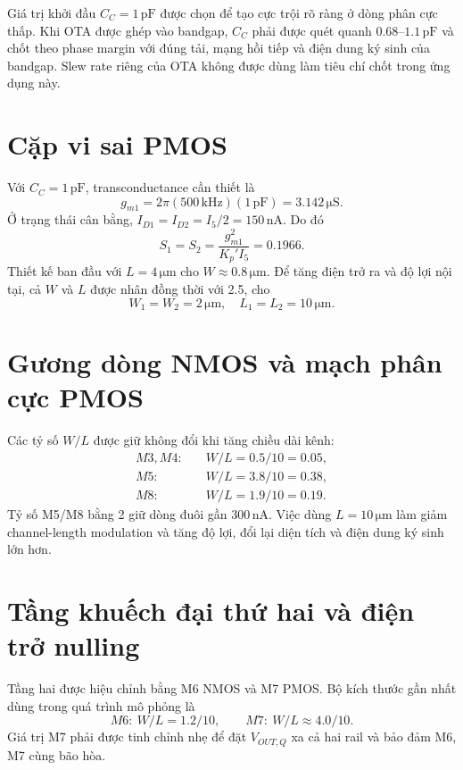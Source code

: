\documentclass[11pt,a4paper]{report}
\newcommand{\micro}{\mu}
\newcommand{\SI}[2]{\ensuremath{#1\,\mathrm{#2}}}
\newcommand{\SIrange}[3]{\ensuremath{#1\text{--}#2\,\mathrm{#3}}}
\begin{document}
Giá trị khởi đầu $C_C=\SI{1}{pF}$ được chọn để tạo cực trội rõ ràng ở dòng phân cực thấp. Khi OTA được ghép vào bandgap, $C_C$ phải được quét quanh \SIrange{0.68}{1.1}{pF} và chốt theo phase margin với đúng tải, mạng hồi tiếp và điện dung ký sinh của bandgap. Slew rate riêng của OTA không được dùng làm tiêu chí chốt trong ứng dụng này.

\section{Cặp vi sai PMOS}
Với $C_C=\SI{1}{pF}$, transconductance cần thiết là
\begin{equation}
g_{m1}=2\pi(\SI{500}{kHz})(\SI{1}{pF})=\boxed{\SI{3.142}{\micro S}}.
\end{equation}
Ở trạng thái cân bằng, $I_{D1}=I_{D2}=I_5/2=\SI{150}{nA}$. Do đó
\begin{equation}
S_1=S_2=\frac{g_{m1}^2}{K_p'I_5}=0.1966.
\end{equation}
Thiết kế ban đầu với $L=\SI{4}{\micro m}$ cho $W\approx\SI{0.8}{\micro m}$. Để tăng điện trở ra và độ lợi nội tại, cả $W$ và $L$ được nhân đồng thời với 2.5, cho
\begin{equation}
\boxed{W_1=W_2=\SI{2}{\micro m},\quad L_1=L_2=\SI{10}{\micro m}}.
\end{equation}

\section{Gương dòng NMOS và mạch phân cực PMOS}
Các tỷ số $W/L$ được giữ không đổi khi tăng chiều dài kênh:
\begin{align}
M3,M4:&\quad W/L=0.5/10=0.05,\\
M5:&\quad W/L=3.8/10=0.38,\\
M8:&\quad W/L=1.9/10=0.19.
\end{align}
Tỷ số M5/M8 bằng 2 giữ dòng đuôi gần \SI{300}{nA}. Việc dùng $L=\SI{10}{\micro m}$ làm giảm channel-length modulation và tăng độ lợi, đổi lại diện tích và điện dung ký sinh lớn hơn.

\section{Tầng khuếch đại thứ hai và điện trở nulling}
Tầng hai được hiệu chỉnh bằng M6 NMOS và M7 PMOS. Bộ kích thước gần nhất dùng trong quá trình mô phỏng là
\begin{equation}
M6:\ W/L=1.2/10,\qquad M7:\ W/L\approx4.0/10.
\end{equation}
Giá trị M7 phải được tinh chỉnh nhẹ để đặt $V_{OUT,Q}$ xa cả hai rail và bảo đảm M6, M7 cùng bão hòa.
\end{document}
